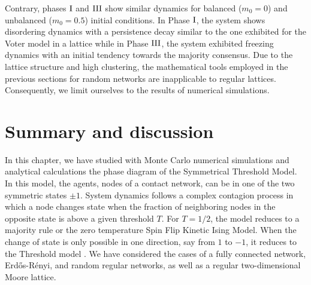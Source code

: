 \begin{figure}[ht]
{		%
		}
\end{figure}
Contrary, phases ${\rm I}$ and ${\rm III}$ show similar dynamics for balanced ($m_0 = 0$) and unbalanced ($m_0 = 0.5$) initial conditions. In Phase ${\rm I}$, the system shows disordering dynamics with a persistence decay similar to the one exhibited for the Voter model in a lattice \cite{ben-naim-1996} while in Phase ${\rm III}$, the system exhibited freezing dynamics with an initial tendency towards the majority consensus. Due to the lattice structure and high clustering, the mathematical tools employed in the previous sections for random networks are inapplicable to regular lattices. Consequently, we limit ourselves to the results of numerical simulations.


\section{\label{sec:Summary and Conclusions_STM} Summary and discussion}

In this chapter, we have studied with Monte Carlo numerical simulations and analytical calculations the phase diagram of the Symmetrical Threshold Model. In this model, the agents, nodes of a contact  network, can be in one of the two symmetric states $\pm 1$.  System dynamics follows a complex contagion process in which a node changes state when the fraction of neighboring nodes in the opposite state is above a given threshold $T$. For $T=1/2$, the model reduces to a majority rule or the zero temperature Spin Flip Kinetic Ising Model. When the change of state is only possible in one direction, say from $1$ to $-1$, it reduces to the Threshold model \cite{granovetter-1978,watts-2002}. We have considered the cases of a fully connected network, Erd\H{o}s-Rényi, and random regular networks, as well as a regular two-dimensional Moore lattice. 


